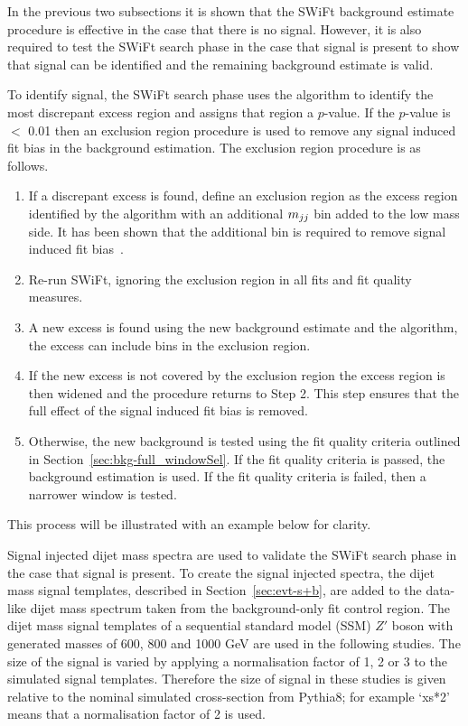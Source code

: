 In the previous two subsections it is shown that the SWiFt background estimate procedure is effective in the case that there is no signal.
However, it is also required to test the SWiFt search phase in the case that signal is present to show that signal can be identified and the remaining background estimate is valid.

To identify signal, the SWiFt search phase uses the \bh{} algorithm to identify the most discrepant excess region and assigns that region a \mbox{$p$-value}.
If the \mbox{$p$-value} is $<$ 0.01 then an exclusion region procedure is used to remove any signal induced fit bias in the background estimation.
The exclusion region procedure is as follows.
\vspace{-0.25em}
\begin{enumerate}[leftmargin=*]
\item If a discrepant excess is found, define an exclusion region as the excess
  region identified by the \bh{} algorithm with an additional $m_{jj}$ bin added to the low mass side.
  It has been shown that the additional bin is required to remove signal induced fit bias~\cite{dijet-mori16_paper}.
\item Re-run SWiFt, ignoring the exclusion region in all fits and fit quality measures.
\item A new excess is found using the new background estimate and the \bh{} algorithm,
  the excess can include bins in the exclusion region.
\item If the new excess is not covered by the exclusion region the excess region is then widened and the procedure returns to Step 2.
  This step ensures that the full effect of the signal induced fit bias is removed.
\item Otherwise, the new background is tested using the fit quality criteria outlined in Section~\ref{sec:bkg-full_windowSel}.
  If the fit quality criteria is passed, the background estimation is used.
  If the fit quality criteria is failed, then a narrower window is tested.
\end{enumerate}
\vspace{-0.25em}
This process will be illustrated with an example below for clarity.

Signal injected dijet mass spectra are used to validate the SWiFt search phase in the case that signal is present.
To create the signal injected spectra, the dijet mass signal templates, described in Section~\ref{sec:evt-s+b},
are added to the data-like dijet mass spectrum taken from the background-only fit control region.
The dijet mass signal templates of a sequential standard model (SSM) $Z'$ boson with generated masses of 600, 800 and 1000 GeV are used in the following studies.
The size of the signal is varied by applying a normalisation factor of 1, 2 or 3 to the simulated signal templates.
Therefore the size of signal in these studies is given relative to the nominal simulated cross-section from {\sc Pythia8};
for example `xs*2' means that a normalisation factor of 2 is used.

